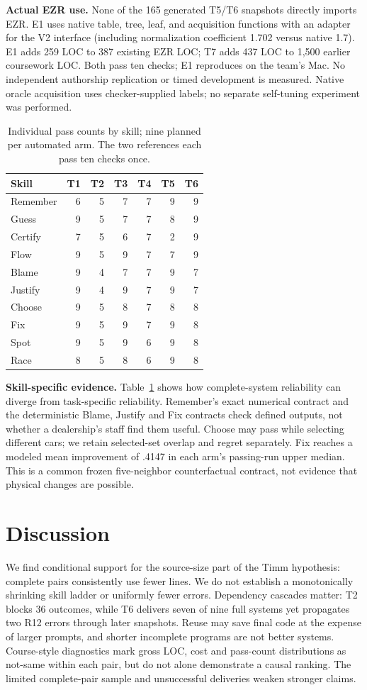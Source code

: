 \documentclass[sigconf,nonacm]{acmart}
\begin{document}
\textbf{Actual EZR use.} None of the 165 generated T5/T6 snapshots directly imports EZR. E1 uses native table, tree, leaf, and acquisition functions with an adapter for the V2 interface (including normalization coefficient 1.702 versus native 1.7). E1 adds 259 LOC to 387 existing EZR LOC; T7 adds 437 LOC to 1,500 earlier coursework LOC. Both pass ten checks; E1 reproduces on the team's Mac. No independent authorship replication or timed development is measured. Native oracle acquisition uses checker-supplied labels; no separate self-tuning experiment was performed.
\begin{table}[t]
\caption{Individual pass counts by skill; nine planned per automated arm. The two references each pass ten checks once.}\label{tab:skillpass}\centering\small
\begin{tabular}{@{}lrrrrrr@{}}\toprule
Skill &T1&T2&T3&T4&T5&T6\\\midrule
Remember&6&5&7&7&9&9\\
Guess&9&5&7&7&8&9\\
Certify&7&5&6&7&2&9\\
Flow&9&5&9&7&7&9\\
Blame&9&4&7&7&9&7\\
Justify&9&4&9&7&9&7\\
Choose&9&5&8&7&8&8\\
Fix&9&5&9&7&9&8\\
Spot&9&5&9&6&9&8\\
Race&8&5&8&6&9&8\\
\bottomrule
\end{tabular}
\end{table}
\textbf{Skill-specific evidence.} Table~\ref{tab:skillpass} shows how complete-system reliability can diverge from task-specific reliability. Remember's exact numerical contract and the deterministic Blame, Justify and Fix contracts check defined outputs, not whether a dealership's staff find them useful. Choose may pass while selecting different cars; we retain selected-set overlap and regret separately. Fix reaches a modeled mean improvement of .4147 in each arm's passing-run upper median. This is a common frozen five-neighbor counterfactual contract, not evidence that physical changes are possible.

\section{Discussion}
We find conditional support for the source-size part of the Timm hypothesis: complete pairs consistently use fewer lines. We do not establish a monotonically shrinking skill ladder or uniformly fewer errors. Dependency cascades matter: T2 blocks 36 outcomes, while T6 delivers seven of nine full systems yet propagates two R12 errors through later snapshots. Reuse may save final code at the expense of larger prompts, and shorter incomplete programs are not better systems. Course-style diagnostics mark gross LOC, cost and pass-count distributions as not-same within each pair, but do not alone demonstrate a causal ranking. The limited complete-pair sample and unsuccessful deliveries weaken stronger claims.
\end{document}
